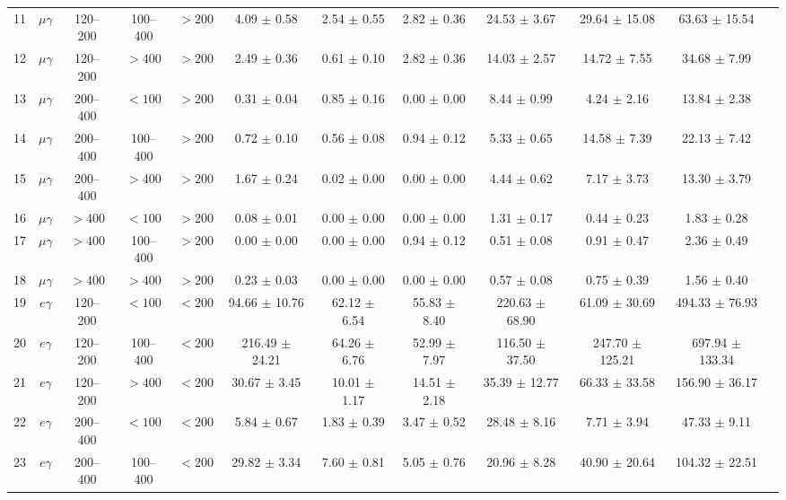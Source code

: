 \begin{table}[htbp]
{\begin{tabular}{|c|c|c|c|c|c|c|c|c|c|c|c|}
11 & $\mu\gamma$ & 120--200 & 100--400 & $>200$ & 4.09 $\pm$ 0.58 & 2.54 $\pm$ 0.55 & 2.82 $\pm$ 0.36 & 24.53 $\pm$ 3.67 & 29.64 $\pm$ 15.08 & 63.63 $\pm$ 15.54 &  \\
12 & $\mu\gamma$ & 120--200 & $>400$ & $>200$ & 2.49 $\pm$ 0.36 & 0.61 $\pm$ 0.10 & 2.82 $\pm$ 0.36 & 14.03 $\pm$ 2.57 & 14.72 $\pm$ 7.55 & 34.68 $\pm$ 7.99 &  \\
13 & $\mu\gamma$ & 200--400 & $<100$ & $>200$ & 0.31 $\pm$ 0.04 & 0.85 $\pm$ 0.16 & 0.00 $\pm$ 0.00 & 8.44 $\pm$ 0.99 & 4.24 $\pm$ 2.16 & 13.84 $\pm$ 2.38 &  \\
14 & $\mu\gamma$ & 200--400 & 100--400 & $>200$ & 0.72 $\pm$ 0.10 & 0.56 $\pm$ 0.08 & 0.94 $\pm$ 0.12 & 5.33 $\pm$ 0.65 & 14.58 $\pm$ 7.39 & 22.13 $\pm$ 7.42 &  \\
15 & $\mu\gamma$ & 200--400 & $>400$ & $>200$ & 1.67 $\pm$ 0.24 & 0.02 $\pm$ 0.00 & 0.00 $\pm$ 0.00 & 4.44 $\pm$ 0.62 & 7.17 $\pm$ 3.73 & 13.30 $\pm$ 3.79 &  \\
16 & $\mu\gamma$ & $>400$ & $<100$ & $>200$ & 0.08 $\pm$ 0.01 & 0.00 $\pm$ 0.00 & 0.00 $\pm$ 0.00 & 1.31 $\pm$ 0.17 & 0.44 $\pm$ 0.23 & 1.83 $\pm$ 0.28 &  \\
17 & $\mu\gamma$ & $>400$ & 100--400 & $>200$ & 0.00 $\pm$ 0.00 & 0.00 $\pm$ 0.00 & 0.94 $\pm$ 0.12 & 0.51 $\pm$ 0.08 & 0.91 $\pm$ 0.47 & 2.36 $\pm$ 0.49 &  \\
18 & $\mu\gamma$ & $>400$ & $>400$ & $>200$ & 0.23 $\pm$ 0.03 & 0.00 $\pm$ 0.00 & 0.00 $\pm$ 0.00 & 0.57 $\pm$ 0.08 & 0.75 $\pm$ 0.39 & 1.56 $\pm$ 0.40 &  \\
\hline
19 & $e\gamma$ & 120--200 & $<100$ & $<200$ & 94.66 $\pm$ 10.76 & 62.12 $\pm$ 6.54 & 55.83 $\pm$ 8.40 & 220.63 $\pm$ 68.90 & 61.09 $\pm$ 30.69 & 494.33 $\pm$ 76.93 &  \\
20 & $e\gamma$ & 120--200 & 100--400 & $<200$ & 216.49 $\pm$ 24.21 & 64.26 $\pm$ 6.76 & 52.99 $\pm$ 7.97 & 116.50 $\pm$ 37.50 & 247.70 $\pm$ 125.21 & 697.94 $\pm$ 133.34 &  \\
21 & $e\gamma$ & 120--200 & $>400$ & $<200$ & 30.67 $\pm$ 3.45 & 10.01 $\pm$ 1.17 & 14.51 $\pm$ 2.18 & 35.39 $\pm$ 12.77 & 66.33 $\pm$ 33.58 & 156.90 $\pm$ 36.17 &  \\
22 & $e\gamma$ & 200--400 & $<100$ & $<200$ & 5.84 $\pm$ 0.67 & 1.83 $\pm$ 0.39 & 3.47 $\pm$ 0.52 & 28.48 $\pm$ 8.16 & 7.71 $\pm$ 3.94 & 47.33 $\pm$ 9.11 &  \\
23 & $e\gamma$ & 200--400 & 100--400 & $<200$ & 29.82 $\pm$ 3.34 & 7.60 $\pm$ 0.81 & 5.05 $\pm$ 0.76 & 20.96 $\pm$ 8.28 & 40.90 $\pm$ 20.64 & 104.32 $\pm$ 22.51 &  \\

\end{tabular}}
\end{table}
